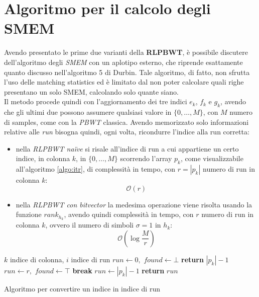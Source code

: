 \section{Algoritmo per il calcolo degli SMEM}
Avendo presentato le prime due varianti della \textbf{RLPBWT}, è possibile
discutere 
dell'algoritmo degli \textit{SMEM} con un aplotipo esterno, che riprende
esattamente quanto discusso nell'algoritmo 5 di Durbin. Tale algoritmo, di
fatto, non sfrutta l'uso delle matching statistics ed è limitato dal non poter
calcolare quali righe presentano un solo SMEM, calcolando solo quante siano.\\
Il metodo procede quindi con l'aggiornamento dei tre indici $e_k$, $f_k$ e
$g_k$, avendo che gli ultimi due possono assumere qualsiasi valore in
$\{0,\ldots, M\}$, con $M$ numero di samples,
come con la \textit{PBWT} classica. Avendo memorizzato solo informazioni
relative alle \textit{run} bisogna quindi, ogni volta, ricondurre l'indice alla
run corretta:
\begin{itemize}
  \item nella \textit{RLPBWT na\"{i}ve} si risale all'indice di run a cui
  appartiene 
  un certo indice, in colonna $k$, in $\{0,\ldots,M\}$ scorrendo l'array $p_k$,
  come visualizzabile all'algoritmo \ref{algo:itr}, di complessità in tempo,
  con $r=|p_k|$ numero di run in colonna $k$:
  \begin{equation}
    \label{eq:itrcomp}
    \mathcal{O}(r)
  \end{equation}
  \item nella \textit{RLPBWT con bitvector} la medesima operazione viene risolta
  usando la funzione $rank_{h_k}$, avendo quindi complessità in tempo, con $r$
  numero di run in colonna $k$, ovvero il numero di simboli $\sigma=1$ in $h_k$:
  \begin{equation}
    \label{eq:itrbvcomp}
    \mathcal{O}\left(\log\frac{M}{r}\right)
  \end{equation}
\end{itemize}
\begin{algorithm}
  \footnotesize
  \begin{algorithmic}[1]
    \Comment $k$ indice di colonna, $i$ indice di run
    \State $run\gets 0,\,\,found\gets \bot$
    \State \textbf{return} $|p_k|-1$
    \EndIf
    \State $run\gets r,\,\,found \gets \top$
    \State \textbf{break}
    \EndIf
    \EndFor
    \State $run\gets|p_k|-1$
    \EndIf
    \State \textbf{return} $run$
    \EndFunction
  \end{algorithmic}
  \caption{Algoritmo per convertire un indice in indice di run}
  \label{algo:itr}
\end{algorithm}

